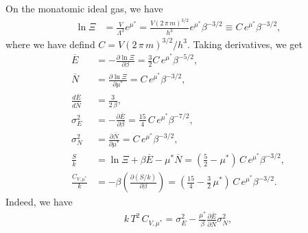 \documentclass[twocolumn, 10pt]{article}
\numberwithin{equation}{section}
\newenvironment{solution}[1][\empty]
{\par\medskip
  \textbf{\ifx\empty#1{Solution.}\relax\else{#1}\fi} \ignorespaces}
{\medskip}
\begin{document}
\begin{solution}
On the monatomic ideal gas, we have
\begin{align*}
  \ln \Xi
  &= \frac{ V } { \Lambda^3 } e^{\mu^*}
  = \frac{ V (2 \, \pi \, m)^{3/2}} { h^3 } e^{\mu^*} \beta^{-3/2}
  \equiv C \, e^{\mu^*} \beta^{-3/2}
  ,
\end{align*}
where we have defind $C = V (2 \, \pi \, m)^{3/2}/h^3$.
%
Taking derivatives, we get
\begin{align*}
  \overline{ E }
  &= - \frac{ \partial \ln \Xi } { \partial \beta }
  = \frac{3}{2} C \, e^{\mu^*} \beta^{-5/2}
  ,
  \\
  \overline{ N }
  &= \frac{ \partial \ln \Xi } { \partial \mu^* }
  = C \, e^{\mu^*} \beta^{-3/2}
  ,
  \\
  \frac{ d\overline E } { d\overline N}
  &=
  \frac{3}{2\,\beta}
  ,
  \\
  \sigma_E^2
  &= - \frac{ \partial \overline{E} } { \partial \beta }
  = \frac{15}{4} \, C \, e^{\mu^*} \beta^{-7/2}
  ,
  \\
  \sigma_N^2
  &= \frac{ \partial \overline{N} } { \partial \mu^* }
  = C \, e^{\mu^*} \beta^{-3/2}
  ,
  \\
  \frac{S}{k}
  &=
  \ln \Xi + \beta \overline{E}
  -\mu^* \overline{N}
  =
  \left(\frac{5}{2} - \mu^* \right) \, C \, e^{\mu^*} \beta^{-3/2}
  ,
  \\
  \frac{C_{V, \mu^*}}{k}
  &= -\beta \left( \frac{\partial (S/k) } {\partial \beta} \right)
  = \left(\frac{15}{4} - \frac{3}{2} \, \mu^* \right)
    \, C \, e^{\mu^*} \beta^{-3/2}
  .
\end{align*}
Indeed, we have
\begin{align}
  k \, T^2 \, C_{V, \mu^*}
  =
  \sigma_E^2
  - \frac{\mu^*}{\beta} \frac{ \partial \overline E } { \partial \overline N} \sigma_N^2
  ,
\end{align}
\end{solution}
\end{document}
